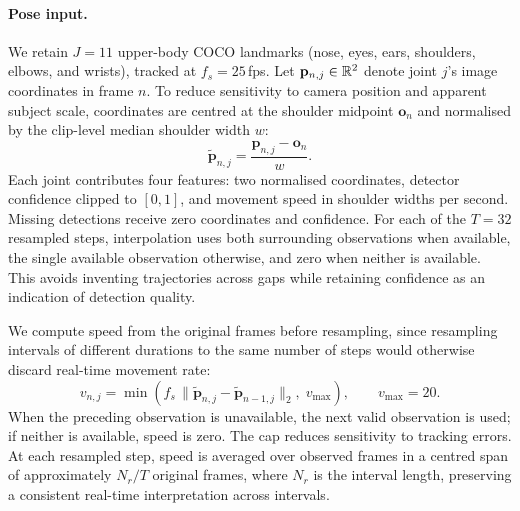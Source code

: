 \paragraph{Pose input.}
We retain $J=11$ upper-body COCO landmarks (nose, eyes, ears, shoulders, elbows, and wrists), tracked at $f_s=25$\,fps. Let $\mathbf{p}_{n,j}\in\mathbb{R}^2$ denote joint $j$'s image coordinates in frame $n$. To reduce sensitivity to camera position and apparent subject scale, coordinates are centred at the shoulder midpoint $\mathbf{o}_n$ and normalised by the clip-level median shoulder width $w$:
\begin{equation}
  \tilde{\mathbf{p}}_{n,j} = \frac{\mathbf{p}_{n,j}-\mathbf{o}_n}{w}.
\end{equation}
Each joint contributes four features: two normalised coordinates, detector confidence clipped to $[0,1]$, and movement speed in shoulder widths per second. Missing detections receive zero coordinates and confidence. For each of the $T=32$ resampled steps, interpolation uses both surrounding observations when available, the single available observation otherwise, and zero when neither is available. This avoids inventing trajectories across gaps while retaining confidence as an indication of detection quality.

We compute speed from the original frames before resampling, since resampling intervals of different durations to the same number of steps would otherwise discard real-time movement rate:
\begin{equation}
  v_{n,j} = \min\!\left(f_s\,\lVert\tilde{\mathbf{p}}_{n,j}-\tilde{\mathbf{p}}_{n-1,j}\rVert_2,\; v_{\max}\right), \qquad v_{\max}=20.
\end{equation}
When the preceding observation is unavailable, the next valid observation is used; if neither is available, speed is zero. The cap reduces sensitivity to tracking errors. At each resampled step, speed is averaged over observed frames in a centred span of approximately $N_r/T$ original frames, where $N_r$ is the interval length, preserving a consistent real-time interpretation across intervals.

